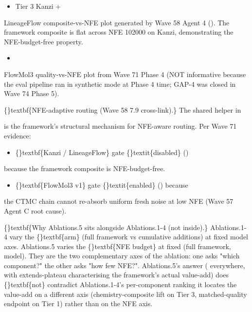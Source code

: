 \documentclass{article}
\begin{document}
\begin{itemize}
\item {}  Tier 3 Kanzi +
\end{itemize}
LineageFlow composite-vs-NFE plot generated by Wave 58 Agent 4 (). The framework composite is flat across NFE 102000 on Kanzi, demonstrating the NFE-budget-free property.

\begin{itemize}
\item {} 
\end{itemize}
FlowMol3 quality-vs-NFE plot from Wave 71 Phase 4 (NOT informative because the eval pipeline ran in synthetic mode at Phase 4 time; GAP-4 was closed in Wave 74 Phase 5).

\{\}textbf\{NFE-adaptive routing (Wave 58 7.9 cross-link).\} The shared helper  in

 is the framework's structural mechanism for NFE-aware routing. Per Wave 71 evidence:

\begin{itemize}
\item \{\}textbf\{Kanzi / LineageFlow\}  gate \{\}textit\{disabled\} ()
\end{itemize}
because the framework composite is NFE-budget-free.

\begin{itemize}
\item \{\}textbf\{FlowMol3 v1\}  gate \{\}textit\{enabled\} () because
\end{itemize}
the CTMC chain cannot re-absorb uniform fresh noise at low NFE (Wave 57 Agent C root cause).

\{\}textbf\{Why Ablations.5 sits alongside Ablations.1-4 (not inside).\} Ablations.1-4 vary the \{\}textbf\{arm\} (full framework vs cumulative additions) at fixed model axes. Ablations.5 varies the \{\}textbf\{NFE budget\} at fixed (full framework, model). They are the two complementary axes of the ablation: one asks "which component?" the other asks "how few NFE?". Ablations.5's answer ( everywhere, with extends-plateau characterising the framework's actual value-add) does \{\}textbf\{not\} contradict Ablations.1-4's per-component ranking  it locates the value-add on a different axis (chemistry-composite lift on Tier 3, matched-quality endpoint on Tier 1) rather than on the NFE axis.
\end{document}
